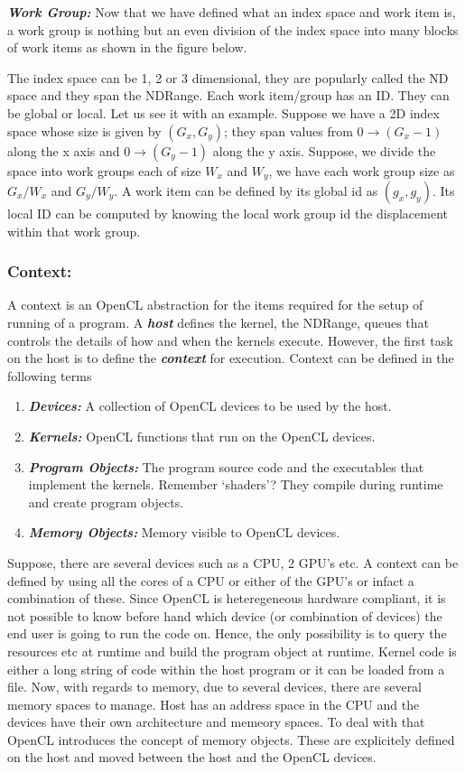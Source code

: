 \documentclass[10pt]{article}
\begin{document}
\textit{\textbf{Work Group:}} Now that we have defined what an index space and work item is, a work group is nothing but an even division of the index space into many blocks of work items as shown in the figure below.


The index space can be 1, 2 or 3 dimensional, they are popularly called the ND space and they span the NDRange. Each work item/group has an ID. They can be global or local. Let us see it with an example. Suppose we have a 2D index space whose size is given by $(G_x, G_y)$; they span values from $0 \rightarrow (G_x-1)$ along the x axis and $0 \rightarrow (G_y-1)$ along the y axis. Suppose, we divide the space into work groups each of size $W_x$ and $W_y$, we have each work group size as $G_x/W_x$ and $G_y/W_y$. A work item can be defined by its global id as $(g_x, g_y)$. Its local ID can be computed by knowing the local work group id the displacement within that work group. 

\subsubsection{Context:}
A context is an OpenCL abstraction for the items required for the setup of running of a program. A \textit{\textbf{host}} defines the kernel, the NDRange, queues that controls the details of how and when the kernels execute. However, the first task on the host is to define the \textit{\textbf{context}} for execution. Context can be defined in the following terms
\begin{enumerate}
	\item \textit{\textbf{Devices:}} A collection of OpenCL devices to be used by the host.
	\item \textit{\textbf{Kernels:}} OpenCL functions that run on the OpenCL devices.
	\item \textit{\textbf{Program Objects:}} The program source code and the executables that implement the kernels. Remember `shaders'? They compile during runtime and create program objects.
	\item \textit{\textbf{Memory Objects:}} Memory visible to OpenCL devices.
\end{enumerate}

Suppose, there are several devices such as a CPU, 2 GPU's etc. A context can be defined by using all the cores of a CPU or either of the GPU's or infact a combination of these. Since OpenCL is heteregeneous hardware compliant, it is not possible to know before hand which device (or combination of devices) the end user is going to run the code on. Hence, the only possibility is to query the resources etc at runtime and build the program object at runtime. Kernel code is either a long string of code within the host program or it can be loaded from a file. Now, with regards to memory, due to several devices, there are several memory spaces to manage. Host has an address space in the CPU and the devices have their own architecture and memeory spaces. To deal with that OpenCL introduces the concept of memory objects. These are explicitely defined on the host and moved between the host and the OpenCL devices.
\end{document}
